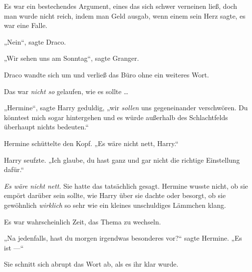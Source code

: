 Es war ein bestechendes Argument, eines das sich schwer verneinen ließ, doch man wurde nicht reich, indem man Geld ausgab, wenn einem sein Herz sagte, es war eine Falle.

„Nein“, sagte Draco.

„Wir sehen uns am Sonntag“, sagte Granger.

Draco wandte sich um und verließ das Büro ohne ein weiteres Wort.

Das war \emph{nicht so} gelaufen, wie es sollte …

\later

„Hermine“, sagte Harry geduldig, „wir \emph{sollen} uns gegeneinander verschwören. Du könntest mich sogar hintergehen und es würde außerhalb des Schlachtfelds überhaupt nichts bedeuten.“

Hermine schüttelte den Kopf.
„Es wäre nicht nett, Harry.“

Harry seufzte.
„Ich glaube, du hast ganz und gar nicht die richtige Einstellung dafür.“

\emph{Es wäre nicht nett.} Sie hatte das tatsächlich gesagt. Hermine wusste nicht, ob sie empört darüber sein sollte, wie Harry über sie dachte oder besorgt, ob sie gewöhnlich \emph{wirklich} so sehr wie ein kleines unschuldiges Lämmchen klang.

Es war wahrscheinlich Zeit, das Thema zu wechseln.

„Na jedenfalls, hast du morgen irgendwas besonderes vor?“ sagte Hermine.
„Es ist —“

Sie schnitt sich abrupt das Wort ab, als es ihr klar wurde.

